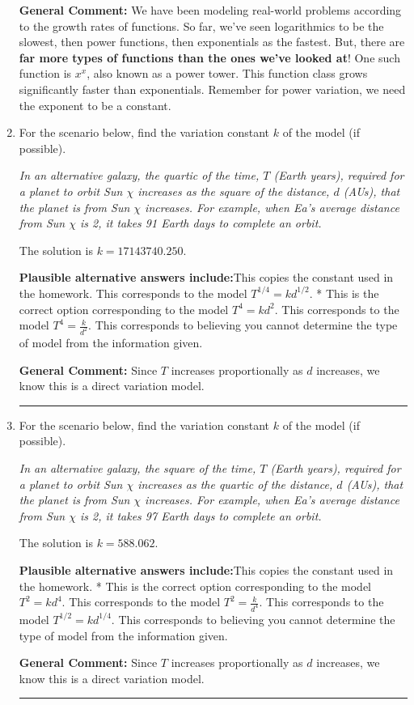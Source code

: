 \documentclass{extbook}[14pt]
\newcommand{\litem}[1]{\item #1

\rule{\textwidth}{0.4pt}}
\begin{document}
\begin{enumerate}
{\begin{enumerate}[label=\Alph*.]
\end{enumerate}

\textbf{General Comment:} We have been modeling real-world problems according to the growth rates of functions. So far, we've seen logarithmics to be the slowest, then power functions, then exponentials as the fastest. But, there are \textbf{far more types of functions than the ones we've looked at}! One such function is $x^x$, also known as a power tower. This function class grows significantly faster than exponentials. Remember for power variation, we need the exponent to be a constant.
}
\litem{
For the scenario below, find the variation constant $k$ of the model (if possible).

\begin{center}
    \textit{ In an alternative galaxy, the quartic of the time, $T$ (Earth years), required for a planet to orbit Sun $\chi$ increases as the square of the distance, $d$ (AUs), that the planet is from Sun $\chi$ increases. For example, when Ea's average distance from Sun $\chi$ is 2, it takes 91 Earth days to complete an orbit. }
\end{center}
The solution is \( k = 17143740.250 \).\begin{enumerate}[label=\Alph*.]
\textbf{Plausible alternative answers include:}This copies the constant used in the homework.
This corresponds to the model $T^{1/4} = k d^{1/2}$.
* This is the correct option corresponding to the model $T^{4} = k d^{2}$.
This corresponds to the model $T^{4} = \frac{k}{d^{2}}$.
This corresponds to believing you cannot determine the type of model from the information given.
\end{enumerate}

\textbf{General Comment:} Since $T$ increases proportionally as $d$ increases, we know this is a direct variation model.
}
\litem{
For the scenario below, find the variation constant $k$ of the model (if possible).

\begin{center}
    \textit{ In an alternative galaxy, the square of the time, $T$ (Earth years), required for a planet to orbit Sun $\chi$ increases as the quartic of the distance, $d$ (AUs), that the planet is from Sun $\chi$ increases. For example, when Ea's average distance from Sun $\chi$ is 2, it takes 97 Earth days to complete an orbit. }
\end{center}
The solution is \( k = 588.062 \).\begin{enumerate}[label=\Alph*.]
\textbf{Plausible alternative answers include:}This copies the constant used in the homework.
* This is the correct option corresponding to the model $T^{2} = k d^{4}$.
This corresponds to the model $T^{2} = \frac{k}{d^{4}}$.
This corresponds to the model $T^{1/2} = k d^{1/4}$.
This corresponds to believing you cannot determine the type of model from the information given.
\end{enumerate}

\textbf{General Comment:} Since $T$ increases proportionally as $d$ increases, we know this is a direct variation model.
}
\end{enumerate}
\end{document}
